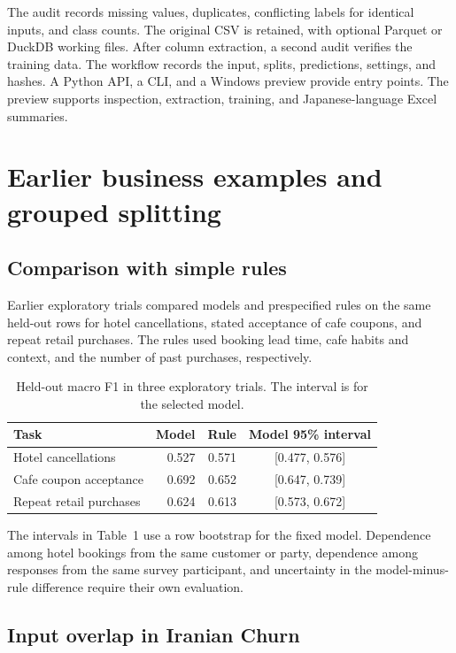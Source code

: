 \documentclass[10pt,a4paper]{article}
\begin{document}
The audit records missing values, duplicates, conflicting labels for identical inputs, and class counts. The original CSV is retained, with optional Parquet or DuckDB working files. After column extraction, a second audit verifies the training data. The workflow records the input, splits, predictions, settings, and hashes. A Python API, a CLI, and a Windows preview provide entry points. The preview supports inspection, extraction, training, and Japanese-language Excel summaries. \cite{audit}

\clearpage
\section{Earlier business examples and grouped splitting}

\subsection{Comparison with simple rules}

Earlier exploratory trials compared models and prespecified rules on the same held-out rows for hotel cancellations, stated acceptance of cafe coupons, and repeat retail purchases. The rules used booking lead time, cafe habits and context, and the number of past purchases, respectively. \cite{business}

\begin{table}[H]
\centering
\caption{Held-out macro F1 in three exploratory trials. The interval is for the selected model.}
\small
\begin{tabular}{lrrc}
\toprule
Task & Model & Rule & Model 95\% interval \\
\midrule
Hotel cancellations & 0.527 & 0.571 & [0.477, 0.576] \\
Cafe coupon acceptance & 0.692 & 0.652 & [0.647, 0.739] \\
Repeat retail purchases & 0.624 & 0.613 & [0.573, 0.672] \\
\bottomrule
\end{tabular}
\end{table}

The intervals in Table~1 use a row bootstrap for the fixed model. Dependence among hotel bookings from the same customer or party, dependence among responses from the same survey participant, and uncertainty in the model-minus-rule difference require their own evaluation.

\subsection{Input overlap in Iranian Churn}
\end{document}
